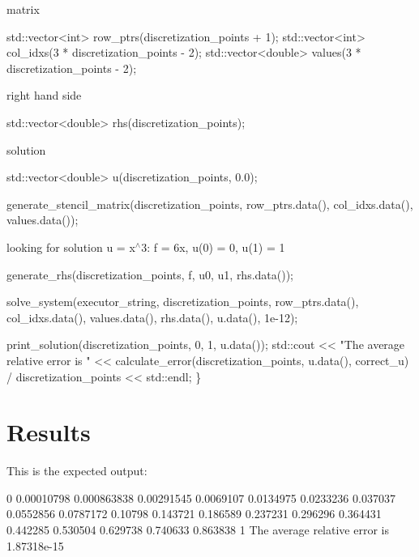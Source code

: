 matrix


\begin{DoxyCode}
std::vector<int> row\_ptrs(discretization\_points + 1);
std::vector<int> col\_idxs(3 * discretization\_points - 2);
std::vector<double> values(3 * discretization\_points - 2);
\end{DoxyCode}


right hand side


\begin{DoxyCode}
std::vector<double> rhs(discretization\_points);
\end{DoxyCode}


solution


\begin{DoxyCode}
std::vector<double> u(discretization\_points, 0.0);

generate\_stencil\_matrix(discretization\_points, row\_ptrs.data(),
                        col\_idxs.data(), values.data());
\end{DoxyCode}


looking for solution u = x$^\wedge$3\+: f = 6x, u(0) = 0, u(1) = 1


\begin{DoxyCode}
    generate\_rhs(discretization\_points, f, u0, u1, rhs.data());

    solve\_system(executor\_string, discretization\_points, row\_ptrs.data(),
                 col\_idxs.data(), values.data(), rhs.data(), u.data(), 1e-12);

    print\_solution(discretization\_points, 0, 1, u.data());
    std::cout << \textcolor{stringliteral}{"The average relative error is "}
              << calculate\_error(discretization\_points, u.data(), correct\_u) /
                     discretization\_points
              << std::endl;
\}
\end{DoxyCode}
 \label{_Results}%
\section*{Results}

This is the expected output\+:


\begin{DoxyCode}
0
0.00010798
0.000863838
0.00291545
0.0069107
0.0134975
0.0233236
0.037037
0.0552856
0.0787172
0.10798
0.143721
0.186589
0.237231
0.296296
0.364431
0.442285
0.530504
0.629738
0.740633
0.863838
1
The average relative error is 1.87318e-15
\end{DoxyCode}


\label{_Commentsaboutprogramminganddebugging}%

